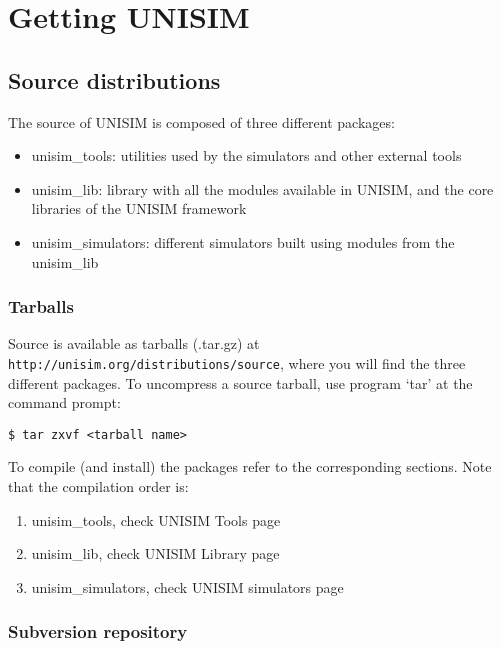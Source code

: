 \section{Getting UNISIM}
\label{getting_unisim}

\subsection{Source distributions}

The source of UNISIM is composed of three different packages:

\begin{itemize}
\item unisim\_tools: utilities used by the simulators and other external tools
\item unisim\_lib: library with all the modules available in UNISIM, and the core libraries of the UNISIM framework
\item unisim\_simulators: different simulators built using modules from the unisim\_lib
\end{itemize}

\subsubsection{Tarballs}

Source is available as tarballs (.tar.gz) at \texttt{http://unisim.org/distributions/source}, where you will find the three different packages.
To uncompress a source tarball, use program ‘tar’ at the command prompt:

\begin{verbatim}
$ tar zxvf <tarball name>
\end{verbatim}

To compile (and install) the packages refer to the corresponding sections. Note that the compilation order is:

\begin{enumerate}
\item unisim\_tools, check UNISIM Tools page
\item unisim\_lib, check UNISIM Library page
\item unisim\_simulators, check UNISIM simulators page
\end{enumerate}

\subsubsection{Subversion repository}

